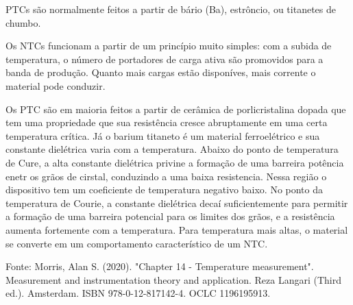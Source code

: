 \documentclass[12pt, onecolumn]{IEEEtran}
\begin{document}
 PTCs são normalmente feitos a partir de bário (Ba), estrôncio, ou titanetes de chumbo.


Os NTCs funcionam a partir de um princípio muito simples: com a subida de temperatura, o número de portadores de carga ativa são promovidos para a banda de produção. Quanto mais cargas estão disponíves, mais corrente o material pode conduzir. 


Os PTC são em maioria feitos a partir de cerâmica de porlicristalina dopada que tem uma propriedade que sua resistência cresce abruptamente em uma certa temperatura crítica. Já o barium titaneto é um material ferroelétrico e sua constante dielétrica varia com a temperatura. Abaixo do ponto de temperatura de Cure, a alta constante dielétrica privine a formação de uma barreira potência enetr os grãos de cirstal, conduzindo a uma baixa resistencia. Nessa região o dispositivo tem um coeficiente de temperatura negativo baixo. No ponto da temperatura de Courie, a constante dielétrica decaí suficientemente para permitir a formação de uma barreira potencial para os limites dos grãos, e a resistência aumenta fortemente com a temperatura. Para temperatura mais altas, o material se converte em um comportamento característico de um NTC.

Fonte:  Morris, Alan S. (2020). "Chapter 14 - Temperature measurement". Measurement and instrumentation theory and application. Reza Langari (Third ed.). Amsterdam. ISBN 978-0-12-817142-4. OCLC 1196195913.
\end{document}
